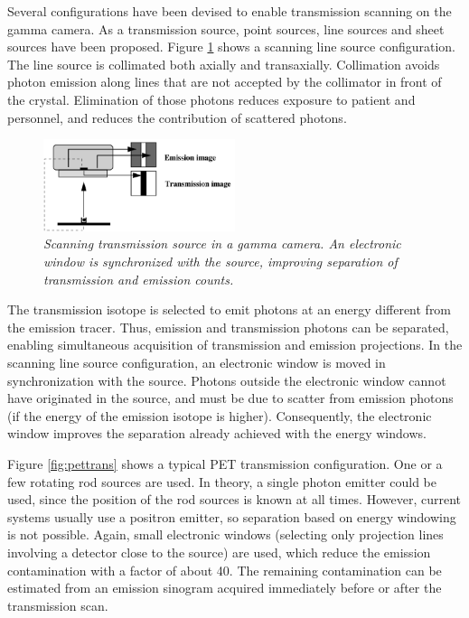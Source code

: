 \documentclass[11pt,oneside]{article}
\begin{document}
Several configurations have been devised to enable transmission
scanning on the gamma camera. As a transmission source, point sources,
line sources and sheet sources have been proposed. Figure
\ref{fig:specttrans} shows a scanning line source configuration. The
line source is collimated both axially and transaxially. Collimation
avoids photon emission along lines that are not accepted by the
collimator in front of the crystal. Elimination of those photons
reduces exposure to patient and personnel, and reduces the
contribution of scattered photons.

\begin{figure}[tb]
\centering
\includegraphics[width=0.5\textwidth]{figs/fig_specttrans.pdf}
\caption{\label{fig:specttrans} \emph{Scanning transmission source in a gamma
camera. An electronic window is synchronized with the source, improving
separation of transmission and emission counts.}}
\end{figure}

The transmission isotope is selected to emit photons at an energy
different from the emission tracer. Thus, emission and transmission
photons can be separated, enabling simultaneous acquisition of
transmission and emission projections. In the scanning line source
configuration, an electronic window is moved in synchronization
with the source. Photons outside the electronic window cannot have
originated in the source, and must be due to scatter from emission
photons (if the energy of the emission isotope is
higher). Consequently, the electronic window improves the separation
already achieved with the energy windows.

Figure \ref{fig:pettrans} shows a typical PET transmission
configuration. One or a few rotating rod sources are used. In theory,
a single photon emitter could be used, since the position of the rod
sources is known at all times. However, current systems usually use a
positron emitter, so separation based on energy windowing is not
possible. Again, small electronic windows (selecting only projection
lines involving a detector close to the source) are used, which reduce
the emission contamination with a factor of about 40. The remaining
contamination can be estimated from an emission sinogram acquired
immediately before or after the transmission scan.
\end{document}
